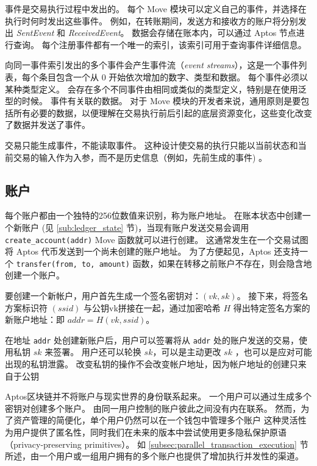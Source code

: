 \documentclass{article}
\begin{document}
事件是交易执行过程中发出的。 每个 Move 模块可以定义自己的事件，并选择在执行时何时发出这些事件。 例如，在转账期间，发送方和接收方的账户将分别发出 \emph{SentEvent} 和 \emph{ReceivedEvent}。 数据会存储在账本内，可以通过 Aptos 节点进行查询。 每个注册事件都有一个唯一的索引，该索引可用于查询事件详细信息。

向同一事件索引发出的多个事件会产生事件流（\emph{event streams}），这是一个事件列表，每个条目包含一个从 0 开始依次增加的数字、类型和数据。 每个事件必须以某种类型定义。 会存在多个不同事件由相同或类似的类型定义，特别是在使用泛型的时候。 事件有关联的数据。 对于 Move 模块的开发者来说，通用原则是要包括所有必要的数据，以便理解在交易执行前后引起的底层资源变化，这些变化改变了数据并发送了事件。

交易只能生成事件，不能读取事件。 这种设计使交易的执行只能以当前状态和当前交易的输入作为入参，而不是历史信息（例如，先前生成的事件) 。

\subsection{账户}
\label{sec:accounts}

每个账户都由一个独特的256位数值来识别，称为账户地址。 在账本状态中创建一个新账户 (见 \ref{sub:ledger_state} 节)，当现有账户发送交易会调用 \texttt{create_account(addr)} Move 函数就可以进行创建。 这通常发生在一个交易试图将 Aptos 代币发送到一个尚未创建的账户地址。 为了方便起见，Aptos 还支持一个 \texttt{transfer(from, to, amount)} 函数，如果在转移之前账户不存在，则会隐含地创建一个账户。


要创建一个新帐户，用户首先生成一个签名密钥对：$(vk, sk)$。 接下来，将签名方案标识符 $(ssid)$ 与公钥vk拼接在一起，通过加密哈希 $H$ 得出特定签名方案的新账户地址：即 $addr = H(vk, ssid)$。

在地址 \texttt{addr} 处创建新账户后，用户可以签署将从 \texttt{addr} 处的账户发送的交易，使用私钥 $sk$ 来签署。 用户还可以轮换 $sk$，可以是主动更改 $sk$ ，也可以是应对可能出现的私钥泄露。 改变私钥的操作不会改变帐户地址，因为帐户地址的创建只来自于公钥

Aptos区块链并不将账户与现实世界的身份联系起来。 一个用户可以通过生成多个密钥对创建多个账户。 由同一用户控制的账户彼此之间没有内在联系。 然而，为了资产管理的简便化，单个用户仍然可以在一个钱包中管理多个账户 这种灵活性为用户提供了匿名性，同时我们在未来的版本中尝试使用更多隐私保护原语（privacy-preserving primitives）。 如 \ref{subsec:parallel_transaction_execution} 节所述，由一个用户或一组用户拥有的多个账户也提供了增加执行并发性的渠道。
\end{document}
